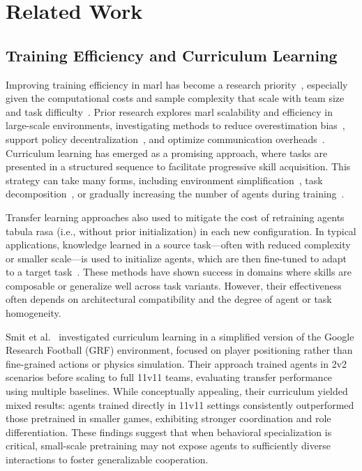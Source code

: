 \documentclass{article}
\begin{document}
\section{Related Work}
\subsection{Training Efficiency and Curriculum Learning}

Improving training efficiency in \gls{marl} has become a research 
priority~\cite{canese2021,krouka2022}, especially given the computational costs and sample 
complexity that scale with team size and task difficulty~\cite{shoham2007,busoniu2008}. 
Prior research explores \gls{marl} scalability and efficiency in large-scale environments, 
investigating methods to reduce overestimation bias~\cite{ackermann2019}, 
support policy decentralization~\cite{foerster2018,lowe2020}, 
and optimize communication overheads~\cite{sukhbaatar2016,wei2022}. 
Curriculum learning has emerged as a promising approach, where tasks are 
presented in a structured sequence to facilitate progressive skill acquisition. 
This strategy can take many forms, including environment simplification~\cite{shukla2022}, 
task decomposition~\cite{shi2023}, or gradually increasing the number of agents 
during training~\cite{smit2023, albrecht2024}.

Transfer learning approaches also used to mitigate the cost of retraining agents 
tabula rasa (i.e., without prior initialization) in each new configuration. 
In typical applications, knowledge learned in a source task—often with reduced 
complexity or smaller scale—is used to initialize agents, 
which are then fine-tuned to adapt to a target task~\cite{cui2022}. 
These methods have shown success in domains where skills are composable 
or generalize well across task variants. However, their effectiveness often 
depends on architectural compatibility and the degree of agent or task homogeneity.

Smit et al.~\cite{smit2023} investigated curriculum learning in a simplified version of the 
Google Research Football (GRF) environment, focused on player positioning rather than 
fine-grained actions or physics simulation. Their approach trained agents in 2v2 scenarios 
before scaling to full 11v11 teams, evaluating transfer performance using multiple baselines. 
While conceptually appealing, their curriculum yielded mixed results: agents trained directly 
in 11v11 settings consistently outperformed those pretrained in smaller games, exhibiting 
stronger coordination and role differentiation. These findings suggest that when behavioral 
specialization is critical, small-scale pretraining may not expose agents to sufficiently 
diverse interactions to foster generalizable cooperation.
\end{document}

